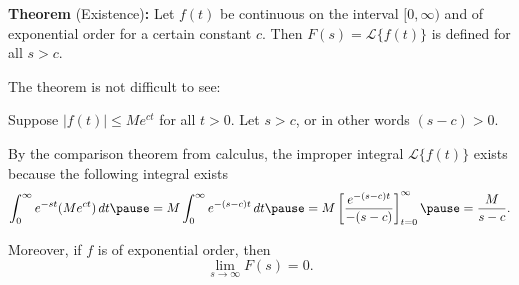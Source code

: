 \documentclass[10pt,aspectratio=169]{beamer}
\begin{document}
\begin{frame}

\textbf{Theorem} (Existence)\textbf{:}
Let $f(t)$ be continuous on the interval $[0,\infty)$ and of exponential order for a certain
constant $c$.  Then $F(s) = \mathcal{L} \bigl\{ f(t) \bigr\}$ is defined for
all $s > c$.

\medskip
\pause

The theorem is not difficult to see:

\medskip

Suppose
$\lvert f(t) \rvert \leq M e^{ct}$ for all $t > 0$.
Let $s > c$, or in other words $(s-c) > 0$.

\medskip
\pause

By the comparison theorem from calculus, the improper integral
$\mathcal{L} \bigl\{ f(t) \bigr\}$ exists because the following integral exists
\begin{equation*}
\int_0^\infty e^{-st} ( M e^{ct} ) \,dt
\pause
=
M \int_0^\infty e^{-(s-c)t} \,dt
\pause
= M \left[ \frac{e^{-(s-c)t}}{-(s-c)}
\right]_{t=0}^\infty
\pause
= \frac{M}{s-c} .
\end{equation*}
\pause

Moreover,
if $f$ is of exponential order, then
\begin{equation*}
\lim_{s\to\infty} F(s) = 0 .
\end{equation*}
\end{frame}
\end{document}

